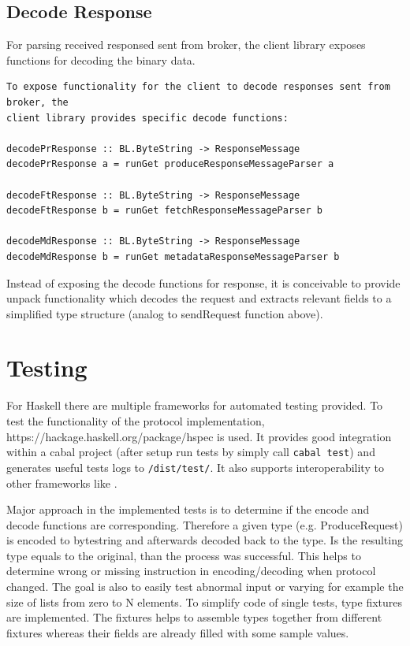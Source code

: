 \subsection{Decode Response}
For parsing received responsed sent from broker, the client library exposes
functions for decoding the binary data. 

\begin{lstlisting}
To expose functionality for the client to decode responses sent from broker, the
client library provides specific decode functions: 

decodePrResponse :: BL.ByteString -> ResponseMessage
decodePrResponse a = runGet produceResponseMessageParser a

decodeFtResponse :: BL.ByteString -> ResponseMessage
decodeFtResponse b = runGet fetchResponseMessageParser b

decodeMdResponse :: BL.ByteString -> ResponseMessage
decodeMdResponse b = runGet metadataResponseMessageParser b
\end{lstlisting}

Instead of exposing the decode functions for response, it is conceivable to
provide unpack functionality which decodes the request and extracts relevant
fields to a simplified type structure (analog to sendRequest function above).

\newpage
\section{Testing}
For Haskell there are multiple frameworks for automated testing provided. To
test the functionality of the protocol implementation, 
{https://hackage.haskell.org/package/hspec} is used. It provides good
integration within a cabal project (after setup run tests by simply call \lstinline{cabal test})
and generates useful tests logs to \lstinline{/dist/test/}. It also supports
interoperability to other frameworks like
.

Major approach in the implemented tests is to determine if the encode and decode
functions are corresponding. Therefore a given type (e.g. ProduceRequest) is
encoded to bytestring and afterwards decoded back to the type. Is the resulting
type equals to the original, than the process was successful. This helps to
determine wrong or missing instruction in encoding/decoding when protocol
changed. The goal is also to easily test abnormal input or varying
for example the size of lists from zero to N elements. To simplify code of
single tests, type fixtures are implemented. The fixtures helps to assemble
types together from different fixtures whereas their fields are already filled
with some sample values. 

